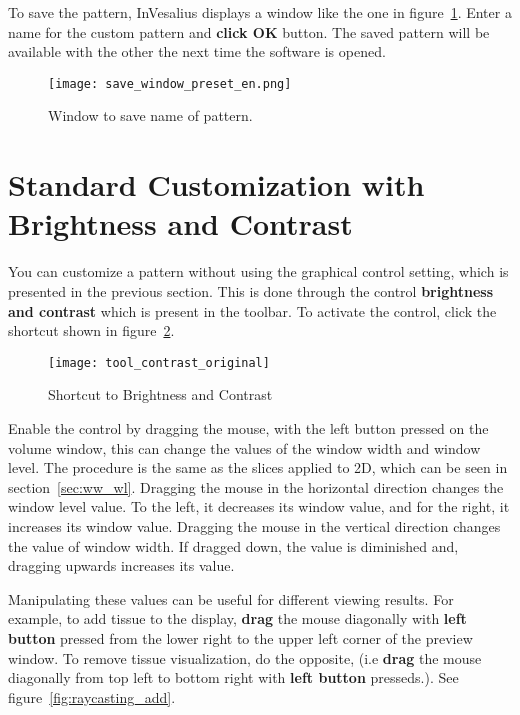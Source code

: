 To save the pattern, InVesalius displays a window like the one in figure~\ref{fig:save_window_preset}.
Enter a name for the custom pattern and \textbf{click OK} button. The saved pattern will be available with the other the next time the software is opened.

\begin{figure}[!htb]
\centering
\texttt{[image: save\_window\_preset\_en.png]}
\caption{Window to save name of pattern.}
\label{fig:save_window_preset}
\end{figure}

\section{Standard Customization with Brightness and Contrast}

You can customize a pattern without using the graphical control setting, which is presented in the previous section. This is done through the control \textbf{brightness and contrast} which is present in the toolbar. To activate the control, click the shortcut shown in figure~\ref{fig:tool_contrast_original_vol}.

\begin{figure}[!htb]
\centering
\texttt{[image: tool\_contrast\_original]}
\caption{Shortcut to Brightness and Contrast}
\label{fig:tool_contrast_original_vol}
\end{figure}

Enable the control by dragging the mouse, with the left button pressed on the volume window, this can change the values of the window width and window level. The procedure is the same as the slices applied to 2D, which can be seen in section~\ref{sec:ww_wl}. Dragging the mouse in the horizontal direction changes  the window level value. To the left, it decreases its window value, and for the right, it increases its window value. Dragging the mouse in the vertical direction changes the value of window width. If dragged down, the value is diminished and, dragging upwards increases its value.

Manipulating these values can be useful for different viewing results. For example, to add tissue to the display, \textbf{drag} the mouse diagonally with \textbf{left button} pressed from the lower right to the upper left corner of the preview window. To remove tissue visualization, do the opposite, (i.e \textbf{drag} the mouse diagonally from top left to bottom right with \textbf{left button} presseds.). See figure~\ref{fig:raycasting_add}.

